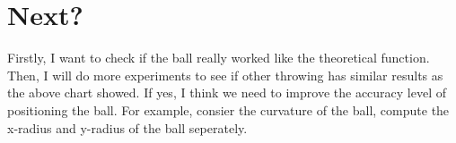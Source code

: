 \documentclass[12pt]{article}
\begin{document}
\section{Next?}
Firstly, I want to check if the ball really worked like the theoretical function. Then, I will do more experiments to see if other throwing has similar results as the above chart showed. If yes, I think we need to improve the accuracy level of positioning the ball. For example, consier the curvature of the ball, compute the x-radius and y-radius of the ball seperately.
\end{document}
